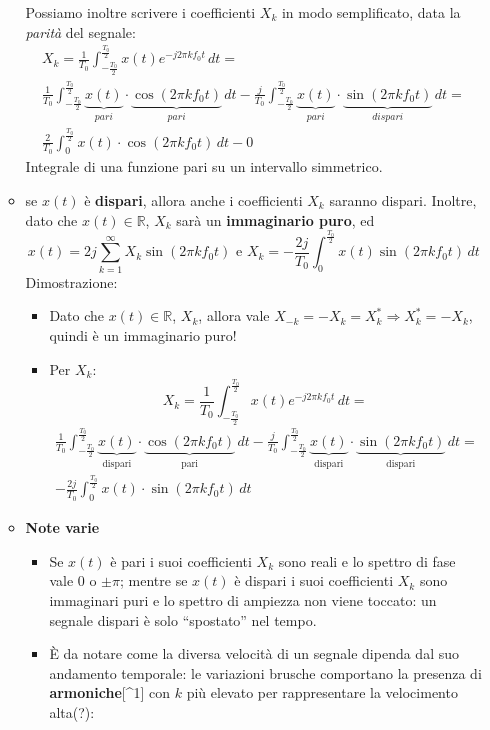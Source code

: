 \documentclass[
]{article}
\providecommand{\tightlist}{%
  \setlength{\itemsep}{0pt}\setlength{\parskip}{0pt}}
\begin{document}
\begin{enumerate}
\begin{itemize}
    Possiamo inoltre scrivere i coefficienti \(X_k\) in modo
    semplificato, data la \emph{parità} del segnale: \begin{gather*}
      X_k = \frac{1}{T_0}\int_{-\frac{T_0}{2}}^{\frac{T_0}{2}} x(t) e^{-j2\pi kf_{0}t} \,dt = \\
      \frac{1}{T_0}\int_{-\frac{T_0}{2}}^{\frac{T_0}{2}} \underbrace{x(t)}_{pari}\cdot\underbrace{\cos{(2\pi kf_{0}t)}}_{pari} \,dt - \frac{j}{T_0}\int_{-\frac{T_0}{2}}^{\frac{T_0}{2}} \underbrace{x(t)}_{pari}\cdot\underbrace{\sin{(2\pi kf_{0}t)}}_{dispari}\,dt=
      \\
      \frac{2}{T_0} \int_{0}^{\frac{T_0}{2}} x(t)\cdot\cos{(2\pi kf_{0}t)} \,dt - 0
      \end{gather*} Integrale di una funzione pari su un intervallo
    simmetrico.
  \item
    se \(x(t)\) è \textbf{dispari}, allora anche i coefficienti \(X_k\)
    saranno dispari. Inoltre, dato che \(x(t)\in\mathbb{R}\), \(X_k\)
    sarà un \textbf{immaginario puro}, ed \[
      x(t)=2j \sum_{k=1}^{\infty} X_{k} \sin{(2\pi k f_{0}t)} \text{ e } X_k=-\frac{2j}{T_0}\int_{0}^{\frac{T_0}{2}}x(t)\sin(2\pi kf_0 t) \,dt
      \] Dimostrazione:

    \begin{itemize}
    \tightlist
    \item
      Dato che \(x(t)\in\mathbb{R}\), \(X_k\), allora vale
      \(X_{-k} = -X_{k} = X_{k}^{*} \Rightarrow X_{k}^{*}=-X_k\), quindi
      è un immaginario puro!
    \item
      Per \(X_k\): \[
        X_k = \frac{1}{T_0}\int_{-\frac{T_0}{2}}^{\frac{T_0}{2}} x(t) e^{-j2\pi kf_{0}t} \,dt =
        \] \begin{gather*}
        \frac{1}{T_0}\int_{-\frac{T_0}{2}}^{\frac{T_0}{2}} \underbrace{x(t)}_{\text{dispari}}\cdot\underbrace{\cos(2\pi kf_{0}t)}_{\text{pari}} \,dt - \frac{j}{T_0}\int_{-\frac{T_0}{2}}^{\frac{T_0}{2}} \underbrace{x(t)}_{\text{dispari}}\cdot\underbrace{\sin(2\pi kf_{0}t)}_{\text{dispari}}\,dt=
        \\
        -\frac{2j}{T_0} \int_{0}^{\frac{T_0}{2}} x(t)\cdot\sin{(2\pi kf_{0}t)} \,dt 
        \end{gather*}
    \end{itemize}
  \item
    \textbf{Note varie}

    \begin{itemize}
    \tightlist
    \item
      Se \(x(t)\) è pari i suoi coefficienti \(X_k\) sono reali e lo
      spettro di fase vale \(0\) o \(\pm \pi\); mentre se \(x(t)\) è
      dispari i suoi coefficienti \(X_k\) sono immaginari puri e lo
      spettro di ampiezza non viene toccato: un segnale dispari è solo
      ``spostato'' nel tempo.
    \item
      È da notare come la diversa velocità di un segnale dipenda dal suo
      andamento temporale: le variazioni brusche comportano la presenza
      di \textbf{armoniche}{[}\^{}1{]} con \(k\) più elevato per
      rappresentare la velocimento alta(?):


\end{itemize}
\end{itemize}
\end{enumerate}
\end{document}
